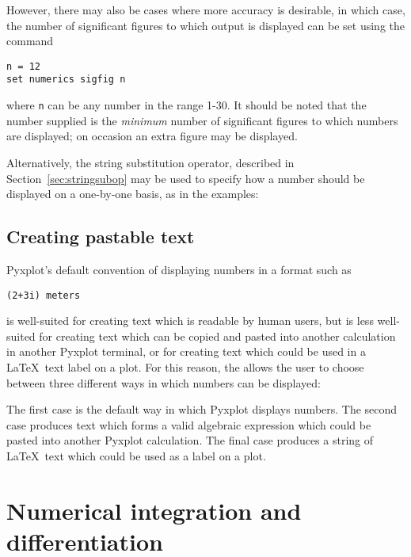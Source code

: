 However, there may also be cases where more accuracy is desirable, in which
case, the number of significant figures to which output is displayed can be set
using the command

\begin{verbatim}
n = 12
set numerics sigfig n
\end{verbatim}

\noindent where {\tt n} can be any number in the range 1-30. It should be noted
that the number supplied is the {\it minimum} number of significant figures to
which numbers are displayed; on occasion an extra figure may be displayed.

Alternatively, the string substitution operator, described in
Section~\ref{sec:stringsubop} may be used to specify how a number should be
displayed on a one-by-one basis, as in the examples:

\vspace{3mm}


\subsection{Creating pastable text}
\label{sec:pastable}

Pyxplot's default convention of displaying numbers in a format such as

\begin{verbatim}
(2+3i) meters
\end{verbatim}

\noindent is well-suited for creating text which is readable by human users, but
is less well-suited for creating text which can be copied and pasted into
another calculation in another Pyxplot terminal, or for creating text which
could be used in a \LaTeX\ text label on a plot. For this reason, the
 allows the user to choose between three
different ways in which numbers can be displayed:

\vspace{3mm}

\vspace{3mm}

The first case is the default way in which Pyxplot displays numbers. The second
case produces text which forms a valid algebraic expression which could be
pasted into another Pyxplot calculation. The final case produces a string of
\LaTeX\ text which could be used as a label on a plot.

\section{Numerical integration and differentiation}

